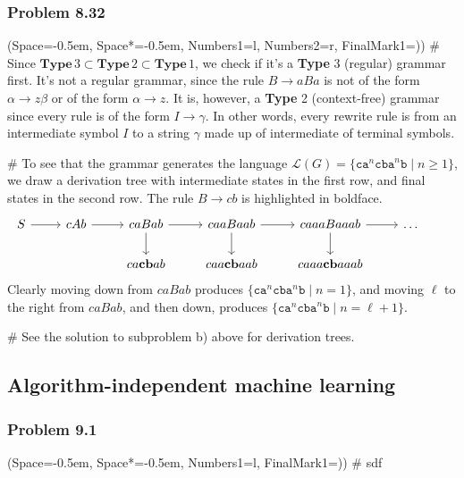 \documentclass[12pt, a4paper]{article}
\newcommand{\listSpace}{-0.5em}%
\begin{document}
{\subsubsection*{Problem 8.32}
\begin{easylist}[enumerate]
	\ListProperties(Space=\listSpace, Space*=\listSpace, Numbers1=l, Numbers2=r, FinalMark1={)})
	# Since $\mathbf{Type } \, 3 \subset \mathbf{Type } \, 2 \subset \mathbf{Type } \, 1$, we check if it's a \textbf{Type} 3 (regular) grammar first.
	It's not a regular grammar, since the rule $B \to aBa$ is not of the form $\alpha \to z \beta$ or of the form $\alpha \to z$.
	It is, however,  a \textbf{Type} 2 (context-free) grammar since every rule is of the form $I \to \gamma$.
	In other words, every rewrite rule is from an intermediate symbol $I$ to a string $\gamma$ made up of intermediate of terminal symbols.
	
	# To see that the grammar generates the language $\mathcal{L}(G) =
	 \{   \mathtt{ca}^n \mathtt{cba}^n \mathtt{b} \mid n \geq 1   \}$, we draw a derivation tree with intermediate states in the first row, and final states in the second row.
	 The rule $B \to cb$ is highlighted in boldface.
	\begin{equation*}
	\begin{tikzcd}
	S \arrow{r} & \arrow{r}  cAb & \arrow{r} \arrow{d} caBab &  \arrow{r} \arrow{d} caaBaab & caaaBaaab \arrow{d} \arrow{r} & \dots  \\
	&   & ca\mathbf{cb}ab & caa\mathbf{cb}aab & caaa\mathbf{cb}aaab & &
	\end{tikzcd}
	\end{equation*}
	Clearly moving down from $caBab$ produces $\{   \mathtt{ca}^n \mathtt{cba}^n \mathtt{b} \mid n =1   \}$, and moving $\ell$ to the right from $caBab$, and then down, produces $\{   \mathtt{ca}^n \mathtt{cba}^n \mathtt{b} \mid n = \ell + 1   \}$.
	
	# See the solution to subproblem b) above for derivation trees.
\end{easylist}




\clearpage
\subsection{Algorithm-independent machine learning}

\subsubsection*{Problem 9.1}
\begin{easylist}[enumerate]
	\ListProperties(Space=\listSpace, Space*=\listSpace, Numbers1=l, FinalMark1={)})
	# sdf
\end{easylist}


}
\end{document}
